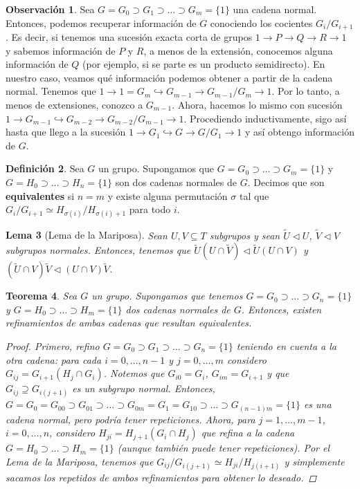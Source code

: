\documentclass[12pt]{book}
\newtheorem{teo}{Teorema}[section]
\newtheorem{lem}[teo]{Lema}
\theoremstyle{definition}
\newtheorem{obs}[teo]{Observación}
\newtheorem{defn}[teo]{Definición}
\begin{document}
\begin{obs}
Sea $G=G_0\supset G_1\supset \ldots \supset G_m = \{1\}$ una cadena normal. Entonces, podemos recuperar información de $G$ conociendo los cocientes $G_{i}/G_{i+1}$. Es decir, si tenemos una sucesión exacta corta de grupos $1\longrightarrow P\longrightarrow Q\longrightarrow R\longrightarrow 1$ y sabemos información de $P$ y $R$, a menos de la extensión, conocemos alguna información de $Q$ (por ejemplo, si se parte es un producto semidirecto).  En nuestro caso, veamos qué información podemos obtener a partir de la cadena normal. Tenemos que $1\longrightarrow 1=G_m\hookrightarrow G_{m-1}\longrightarrow G_{m-1}/G_m \longrightarrow 1$. Por lo tanto, a menos de extensiones, conozco a $G_{m-1}$. Ahora, hacemos lo mismo con sucesión $1\longrightarrow G_{m-1}\hookrightarrow G_{m-2}\longrightarrow G_{m-2}/G_{m-1} \longrightarrow 1$. Procediendo inductivamente, sigo así hasta que llego a la sucesión $1\longrightarrow G_1\hookrightarrow G\longrightarrow G/G_1\longrightarrow 1$ y así obtengo información de $G$.
\end{obs}

\begin{defn}
Sea $G$ un grupo. Supongamos que $G=G_0\supset\ldots\supset G_m = \{1\}$ y $G=H_0\supset\ldots\supset H_n=\{1\}$ son dos cadenas normales de $G$. Decimos que son \textbf{equivalentes} si $n=m$ y existe alguna permutación $\sigma$ tal que $G_{i}/G_{i+1}\simeq H_{\sigma(i)}/H_{\sigma(i)+1}$ para todo $i$.
\end{defn}

\begin{lem}[Lema de la Mariposa]
Sean $U,V\subseteq T$ subgrupos y sean $\widetilde{U}\triangleleft U$, $\widetilde{V}\triangleleft V$ subgrupos normales. Entonces, tenemos que $\widetilde{U}(U\cap\widetilde{V})\triangleleft \widetilde{U}(U\cap V)$ y $(\widetilde{U}\cap V)\widetilde{V}\triangleleft (U\cap V)\widetilde{V}$.
\end{lem}

\begin{teo}
Sea $G$ un grupo. Supongamos que tenemos $G=G_0\supset\ldots\supset G_n = \{1\}$ y $G=H_0\supset\ldots\supset H_m=\{1\}$ dos cadenas normales de $G$. Entonces, existen refinamientos de ambas cadenas que resultan equivalentes.
\begin{proof}
Primero, refino $G=G_0\supset G_1\supset\ldots\supset G_n=\{1\}$ teniendo en cuenta a la otra cadena: para cada $i=0,\ldots , n-1$ y $j=0,\ldots , m$ considero $G_{ij}=G_{i+1}(H_j\cap G_i)$. Notemos que $G_{i0}=G_i$, $G_{im}=G_{i+1}$ y que $G_{ij}\supseteq G_{i(j+1)}$ es un subgrupo normal. Entonces, $G=G_0=G_{00}\supset G_{01}\supset\ldots\supset G_{0m}=G_1 = G_{10}\supset \ldots\supset G_{(n-1)m}=\{1\}$ es una cadena normal, pero podría tener repeticiones. Ahora, para $j=1,\ldots , m-1$, $i=0,\ldots ,n$, considero $H_{ji}=H_{j+1}(G_i\cap H_j)$ que refina a la cadena $G=H_0\supset\ldots \supset H_m=\{1\}$ (aunque también puede tener repeticiones). Por el Lema de la Mariposa, tenemos que $G_{ij}/G_{i(j+1)}\simeq H_{ji}/H_{j(i+1)}$ y simplemente sacamos los repetidos de ambos refinamientos para obtener lo deseado.
\end{proof}
\end{teo}
\end{document}
